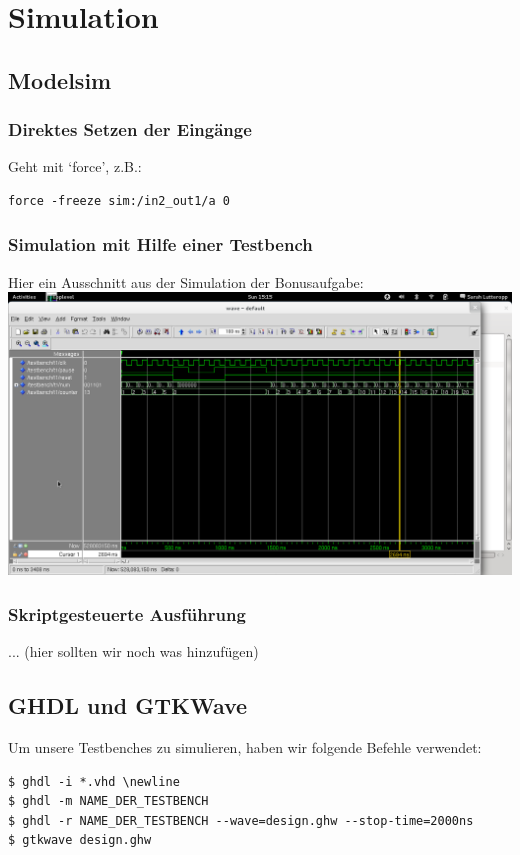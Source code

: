 \documentclass[a4paper, 11pt]{article}
\theoremstyle{definition}
\theoremstyle{plain}
\begin{document}
\section{Simulation}

\subsection{Modelsim}

\subsubsection{Direktes Setzen der Eingänge}
Geht mit `force', z.B.:
\begin{lstlisting}
force -freeze sim:/in2_out1/a 0
\end{lstlisting}

\subsubsection{Simulation mit Hilfe einer Testbench}
Hier ein Ausschnitt aus der Simulation der Bonusaufgabe: \newline
\includegraphics[width=\textwidth]{bonus.png}

\subsubsection{Skriptgesteuerte Ausführung}
... (hier sollten wir noch was hinzufügen)

\subsection{GHDL und GTKWave}
Um unsere Testbenches zu simulieren, haben wir folgende Befehle verwendet:
\begin{lstlisting}
$ ghdl -i *.vhd \newline
$ ghdl -m NAME_DER_TESTBENCH
$ ghdl -r NAME_DER_TESTBENCH --wave=design.ghw --stop-time=2000ns
$ gtkwave design.ghw
\end{lstlisting}
\end{document}
